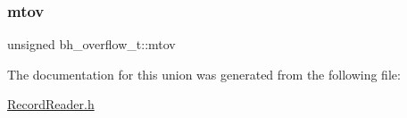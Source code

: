 \mbox{\label{unionbh__overflow__t_a2782e17c346ef069fd780760162aa140}} 
\subsubsection{\texorpdfstring{mtov}{mtov}}
{\footnotesize\ttfamily unsigned bh\+\_\+overflow\+\_\+t\+::mtov}



The documentation for this union was generated from the following file\+:\begin{DoxyCompactItemize}
\item 
\hyperlink{_record_reader_8h}{Record\+Reader.\+h}\end{DoxyCompactItemize}
